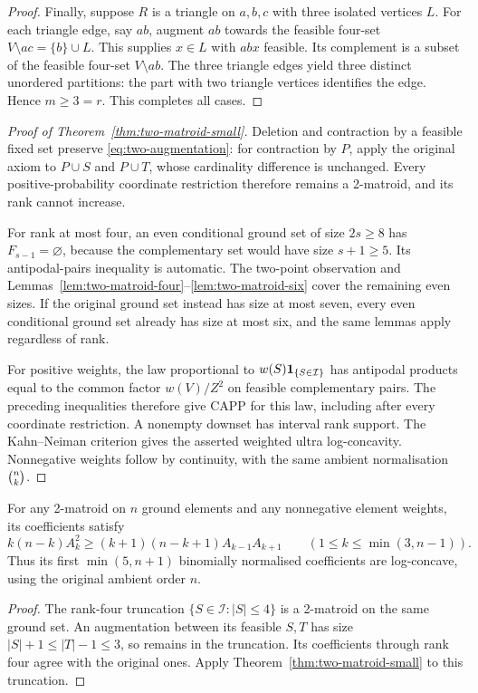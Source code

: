 \begin{proof}
Finally, suppose $R$ is a triangle on $a,b,c$ with three isolated vertices
$L$. For each triangle edge, say $ab$, augment $ab$ towards the feasible
four-set $V\setminus ac=\{b\}\cup L$. This supplies $x\in L$ with $abx$
feasible. Its complement is a subset of the feasible four-set
$V\setminus ab$. The three triangle edges yield three distinct unordered
partitions: the part with two triangle vertices identifies the edge.
Hence $m\ge3=r$. This completes all cases.
\end{proof}

\begin{proof}[Proof of Theorem~\ref{thm:two-matroid-small}]
Deletion and contraction by a feasible fixed set preserve
\eqref{eq:two-augmentation}: for contraction by $P$, apply the original
axiom to $P\cup S$ and $P\cup T$, whose cardinality difference is unchanged.
Every positive-probability coordinate restriction therefore remains a
2-matroid, and its rank cannot increase.

For rank at most four, an even conditional ground set of size $2s\ge8$
has $F_{s-1}=\varnothing$, because the complementary set would have size
$s+1\ge5$. Its antipodal-pairs inequality is automatic. The two-point
observation and Lemmas~\ref{lem:two-matroid-four}--\ref{lem:two-matroid-six}
cover the remaining even sizes. If the original ground set instead has
size at most seven, every even conditional ground set already has size at
most six, and the same lemmas apply regardless of rank.

For positive weights, the law proportional to $w(S)\mathbf 1_{\{S\in\mathcal I\}}$
has antipodal products equal to the common factor $w(V)/Z^2$ on feasible
complementary pairs. The preceding inequalities therefore give CAPP for
this law, including after every coordinate restriction. A nonempty
downset has interval rank support. The Kahn--Neiman criterion \cite{KN}
gives the asserted weighted ultra log-concavity. Nonnegative weights follow
by continuity, with the same ambient normalisation $\binom{n}{k}$.
\end{proof}

\begin{corollary}
\label{cor:two-matroid-initial}
For any 2-matroid on $n$ ground elements and any nonnegative element
weights, its coefficients satisfy
\[
k(n-k)A_k^2\ge(k+1)(n-k+1)A_{k-1}A_{k+1}
\qquad(1\le k\le\min(3,n-1)).
\]
Thus its first $\min(5,n+1)$ binomially normalised coefficients are
log-concave, using the original ambient order $n$.
\end{corollary}
\begin{proof}
The rank-four truncation $\{S\in\mathcal I:|S|\le4\}$ is a 2-matroid on
the same ground set. An augmentation between its feasible $S,T$ has size
$|S|+1\le|T|-1\le3$, so remains in the truncation. Its coefficients through
rank four agree with the original ones. Apply
Theorem~\ref{thm:two-matroid-small} to this truncation.
\end{proof}

